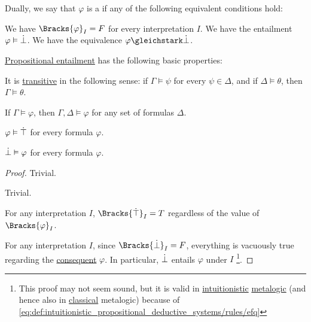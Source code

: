 \begin{definition}
\begin{thmenum}
     Dually, we say that \( \varphi \) is a  if any of the following equivalent conditions hold:
    \begin{thmenum}
       We have \( \Bracks{\varphi}_I = F \) for every interpretation \( I \).
       We have the entailment \( \varphi \vDash \dot\bot \).
       We have the equivalence \( \varphi \gleichstark \synbot \).
    \end{thmenum}
  \end{thmenum}
\end{definition}

\begin{proposition}\label{thm:def:propositional_entailment}
  \hyperref[def:propositional_semantics/entailment]{Propositional entailment} has the following basic properties:
  \begin{thmenum}
     It is \hyperref[def:binary_relation/transitive]{transitive} in the following sense: if \( \Gamma \vDash \psi \) for every \( \psi \in \Delta \), and if \( \Delta \vDash \theta \), then \( \Gamma \vDash \theta \).

     If \( \Gamma \vDash \varphi \), then \( \Gamma, \Delta \vDash \varphi \) for any set of formulas \( \Delta \).

     \( \varphi \vDash \dot\top \) for every formula \( \varphi \).

     \( \dot\bot \vDash \varphi \) for every formula \( \varphi \).
  \end{thmenum}
\end{proposition}
\begin{proof}
   Trivial.

   Trivial.

   For any interpretation \( I \), \( \Bracks{\syntop}_I = T \) regardless of the value of \( \Bracks{\varphi}_I \).

   For any interpretation \( I \), since \( \Bracks{\synbot}_I = F \), everything is vacuously true regarding the \hyperref[def:material_implication/consequent]{consequent} \( \varphi \). In particular, \( \dot\bot \) entails \( \varphi \) under \( I \) \footnote{This proof may not seem sound, but it is valid in \hyperref[rem:intuitionistic_logic]{intuitionistic} \hyperref[rem:metalogic]{metalogic} (and hence also in \hyperref[rem:classical_logic]{classical} metalogic) because of \eqref{eq:def:intuitionistic_propositional_deductive_systems/rules/efq}}.
\end{proof}

